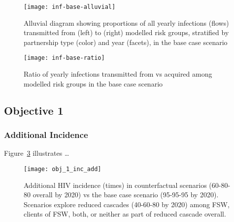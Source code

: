 \begin{figure}[h]
  \texttt{[image: inf-base-alluvial]}
  \caption{Alluvial diagram showing proportions of all yearly infections (flows)
    transmitted from (left) to (right) modelled risk groups,
    stratified by partnership type (color) and year (facets),
    in the base case scenario}
  \label{fig:inf.alluvial}
\end{figure}
\begin{figure}[h]
  \centering
  \texttt{[image: inf-base-ratio]}
  \caption{Ratio of yearly infections transmitted from vs acquired among modelled risk groups
    in the base case scenario}
  \label{fig:inf.ratio}
\end{figure}
\clearpage
\subsection{Objective 1}\label{a:res.1}
\subsubsection{Additional Incidence}
\par
Figure~\ref{fig:obj.1.inc.add} illustrates \dots
\begin{figure}[h]
  \centering
  \texttt{[image: obj\_1\_inc\_add]}
  \caption{Additional HIV incidence (times) in counterfactual scenarios (60-80-80 overall by 2020)
    vs the base case scenario (95-95-95 by 2020).
    Scenarios explore reduced cascades (40-60-80 by 2020) among FSW, clients of FSW, both, or neither
    as part of reduced cascade overall.}
  \label{fig:obj.1.inc.add}
\end{figure}
